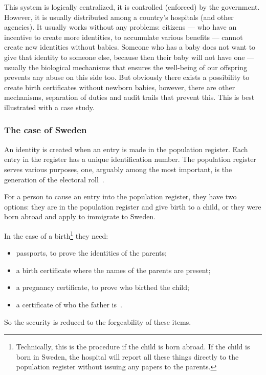 This system is logically centralized, it is controlled (enforced) by the 
government.
However, it is usually distributed among a country's hospitals (and other 
agencies).
It usually works without any problems: citizens --- who have an incentive to 
create more identities, \eg to accumulate various benefits --- cannot create 
new identities without babies.
Someone who has a baby does not want to give that identity to someone else, 
because then their baby will not have one --- usually the biological mechanisms 
that ensures the well-being of our offspring prevents any abuse on this side 
too.
But obviously there exists a possibility to create birth certificates without 
newborn babies, however, there are other mechanisms, \eg separation of duties 
and audit trails that prevent this.
This is best illustrated with a case study.

\subsubsection{The case of Sweden}

An identity is created when an entry is made in the population register.
Each entry in the register has a unique identification number.
The population register serves various purposes, one, arguably among the most 
important, is the generation of the electoral 
roll~\cite{Valmyndigheten-ElectoralRoll}.

For a person to cause an entry into the population register, they have two 
options:
they are in the population register and give birth to a child, or
they were born abroad and apply to immigrate to Sweden.

In the case of a birth\footnote{%
  Technically, this is the procedure if the child is born abroad.
  If the child is born in Sweden, the hospital will report all these things 
  directly to the population register without issuing any papers to the 
  parents.
} they need:
\begin{itemize}
  \item passports, to prove the identities of the parents;
  \item a birth certificate where the names of the parents are present;
  \item a pregnancy certificate, to prove who birthed the child;
  \item a certificate of who the father is~\cite{Skatteverket-RegisterBirth}.
\end{itemize}
So the security is reduced to the forgeability of these items.

